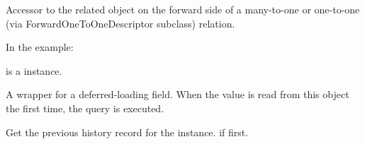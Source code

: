 \documentclass[letterpaper,10pt,english]{sphinxmanual}
\begin{document}
\begin{fulllineitems}

\begin{fulllineitems}
\label{\detokenize{modules/models:gestion.models.HistoricalConsumptionHistory.paymentMethod}}
Accessor to the related object on the forward side of a many-to-one or
one-to-one (via ForwardOneToOneDescriptor subclass) relation.

In the example:

\begin{sphinxVerbatim}[commandchars=\\\{\}]
 
       
\end{sphinxVerbatim}

 is a  instance.

\end{fulllineitems}


\begin{fulllineitems}
\label{\detokenize{modules/models:gestion.models.HistoricalConsumptionHistory.paymentMethod_id}}
A wrapper for a deferred-loading field. When the value is read from this
object the first time, the query is executed.

\end{fulllineitems}


\begin{fulllineitems}
\label{\detokenize{modules/models:gestion.models.HistoricalConsumptionHistory.prev_record}}
Get the previous history record for the instance.  if first.


\end{fulllineitems}
\end{fulllineitems}
\end{document}
